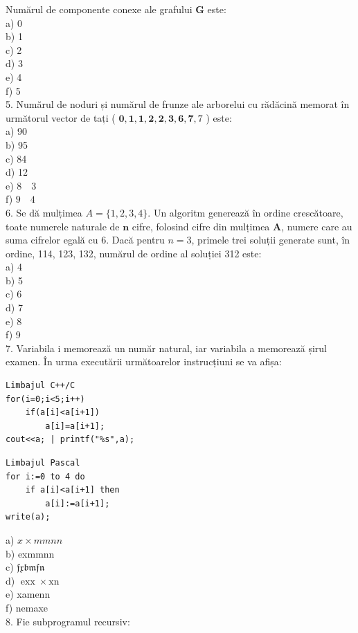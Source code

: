 \documentclass[10pt]{article}
\begin{document}
Numărul de componente conexe ale grafului $\mathbf{G}$ este:\\
a) 0\\
b) 1\\
c) 2\\
d) 3\\
e) 4\\
f) 5\\
5. Numărul de noduri și numărul de frunze ale arborelui cu rădăcină memorat în următorul vector de tați ( $\mathbf{0}, \mathbf{1}, \mathbf{1}, \mathbf{2}, \mathbf{2}, \mathbf{3}, \mathbf{6}, \mathbf{7}, 7$ ) este:\\
a) 90\\
b) 95\\
c) 84\\
d) 12\\
e) $8 \quad 3$\\
f) $9 \quad 4$\\
6. Se dă mulțimea $A=\{1,2,3,4\}$. Un algoritm generează în ordine crescătoare, toate numerele naturale de $\mathbf{n}$ cifre, folosind cifre din mulțimea $\mathbf{A}$, numere care au suma cifrelor egală cu 6. Dacă pentru $n=3$, primele trei soluții generate sunt, în ordine, 114, 123, 132, numărul de ordine al soluției 312 este:\\
a) 4\\
b) 5\\
c) 6\\
d) 7\\
e) 8\\
f) 9\\
7. Variabila i memorează un număr natural, iar variabila a memorează șirul examen. În urma executării următoarelor instrucțiuni se va afișa:

\begin{verbatim}
Limbajul C++/C
for(i=0;i<5;i++)
    if(a[i]<a[i+1])
        a[i]=a[i+1];
cout<<a; | printf("%s",a);
\end{verbatim}

\begin{verbatim}
Limbajul Pascal
for i:=0 to 4 do
    if a[i]<a[i+1] then
        a[i]:=a[i+1];
write(a);
\end{verbatim}

a) $x \times m m n n$\\
b) exmmnn\\
c) $\mathfrak{f x b m f n}$\\
d) $\operatorname{exx} \times \mathrm{xn}$\\
e) xamenn\\
f) nemaxe\\
8. Fie subprogramul recursiv:
\end{document}
